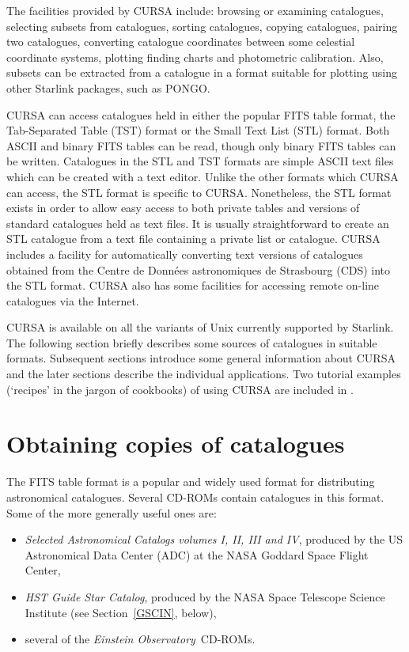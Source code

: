 \documentclass[twoside,11pt]{starlink}
\begin{document}
The facilities provided by CURSA include: browsing or examining catalogues,
selecting subsets from catalogues, sorting catalogues, copying catalogues,
pairing two catalogues, converting catalogue coordinates between some
celestial coordinate systems, plotting finding charts and photometric
calibration.  Also, subsets can be extracted from a catalogue in a format
suitable for plotting using other Starlink packages, such as PONGO.

CURSA can access catalogues held in either the popular FITS table format,
the Tab-Separated Table (TST) format or the Small Text List (STL) format.
Both ASCII and binary FITS tables can be read, though only binary FITS
tables can be written.  Catalogues in the STL and TST formats are simple
ASCII text files which can be created with a text editor.  Unlike the other
formats which CURSA can access, the STL format is specific to CURSA.
Nonetheless, the STL format exists in order to allow easy access to both
private tables and versions of standard catalogues held as text files.  It
is usually straightforward to create an STL catalogue from a text file
containing a private list or catalogue.  CURSA includes a facility for
automatically converting text versions of catalogues obtained from the
Centre de Donn\'{e}es astronomiques de Strasbourg (CDS) into the STL format.
CURSA also has some facilities for accessing remote on-line catalogues via
the Internet.

CURSA is available on all the variants of Unix currently supported by
Starlink.  The following section briefly describes some sources of
catalogues in suitable formats.  Subsequent sections introduce
some general information about CURSA and the later sections describe the
individual applications.  Two tutorial examples (`recipes' in the jargon
of cookbooks) of using CURSA are included in \/\cite{SC6}.


\section{\label{OBTAIN}Obtaining copies of catalogues}

The FITS table format is a popular and widely used format for
distributing astronomical catalogues. Several CD-ROMs contain catalogues
in this format.  Some of the more generally useful ones are:

\begin{itemize}

  \item \textit{Selected Astronomical Catalogs volumes I, II, III and IV},
   produced by the US Astronomical Data Center (ADC) at the NASA Goddard
   Space Flight Center,

  \item \textit{HST Guide Star Catalog}, produced by the NASA Space Telescope
   Science Institute (see Section~\ref{GSCIN}, below),

  \item several of the \textit{Einstein Observatory}\, CD-ROMs.

\end{itemize}
\end{document}
